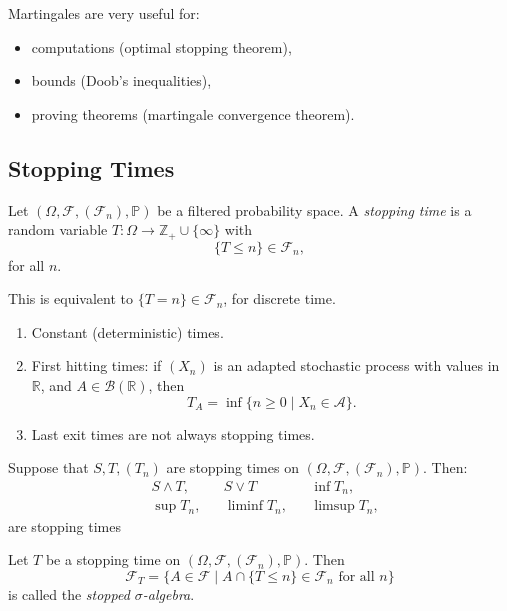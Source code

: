 \documentclass[12pt]{article}
\begin{document}
Martingales are very useful for:
\begin{itemize}
	\item computations (optimal stopping theorem),
	\item bounds (Doob's inequalities),
	\item proving theorems (martingale convergence theorem).
\end{itemize}

\subsection{Stopping Times}%
\label{sub:stop}

\begin{definition}
	Let $(\Omega, \mathcal{F}, (\mathcal{F}_n), \mathbb{P})$ be a filtered probability space. A \emph{stopping time} is a random variable $T : \Omega \to \mathbb{Z}_+ \cup \{\infty\}$ with
	\[
		\{T \leq n\} \in \mathcal{F}_n,
	\]
	for all $n$.
\end{definition}

This is equivalent to $\{T = n\} \in \mathcal{F}_n$, for discrete time.

\begin{exbox}
	\begin{enumerate}
		\item Constant (deterministic) times.
		\item First hitting times: if $(X_n)$ is an adapted stochastic process with values in $\mathbb{R}$, and $A \in \mathcal{B}(\mathbb{R})$, then
			\[
			T_A = \inf\{n \geq 0 \mid X_n \in \mathcal{A}\}.
			\]
		\item Last exit times are not always stopping times.
	\end{enumerate}	
\end{exbox}

\begin{proposition}
	Suppose that $S, T, (T_n)$ are stopping times on $(\Omega, \mathcal{F}, (\mathcal{F}_n), \mathbb{P})$. Then:
	\begin{align*}
		&S \wedge T, &  &S \vee T & & \inf T_n, \\
		&\sup T_n, & &\liminf T_n, & & \limsup T_n,
	\end{align*}
	are stopping times
\end{proposition}

\begin{definition}
	Let $T$ be a stopping time on $(\Omega, \mathcal{F}, (\mathcal{F}_n), \mathbb{P})$. Then
	\[
		\mathcal{F}_T = \{A \in \mathcal{F} \mid A \cap \{T \leq n\} \in \mathcal{F}_n \text{ for all }n \}
	\]
	is called the \emph{stopped $\sigma$-algebra}.
\end{definition}
\end{document}
